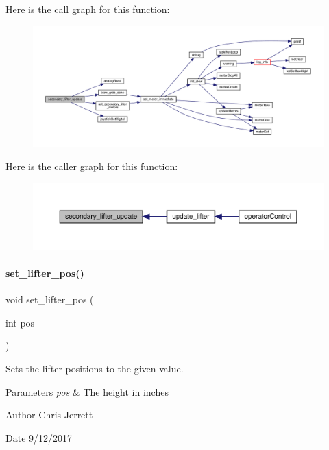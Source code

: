 Here is the call graph for this function\+:
\nopagebreak
\begin{figure}[H]
\begin{center}
\leavevmode
\includegraphics[width=350pt]{lifter_8c_ac59fe6ffc80bab7f117ec0a8e482277b_cgraph}
\end{center}
\end{figure}
Here is the caller graph for this function\+:
\nopagebreak
\begin{figure}[H]
\begin{center}
\leavevmode
\includegraphics[width=350pt]{lifter_8c_ac59fe6ffc80bab7f117ec0a8e482277b_icgraph}
\end{center}
\end{figure}
\mbox{\label{lifter_8c_abddc7cb502e12fa277b627c90a45efb1}} 
\paragraph{set\+\_\+lifter\+\_\+pos()}
{\footnotesize\ttfamily void set\+\_\+lifter\+\_\+pos (\begin{DoxyParamCaption}\item[{int}]{pos }\end{DoxyParamCaption})}



Sets the lifter positions to the given value. 


\begin{DoxyParams}{Parameters}
{\em pos} & The height in inches \\
\hline
\end{DoxyParams}
\begin{DoxyAuthor}{Author}
Chris Jerrett 
\end{DoxyAuthor}
\begin{DoxyDate}{Date}
9/12/2017 
\end{DoxyDate}


